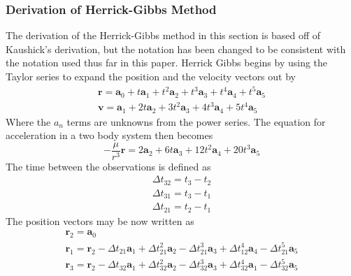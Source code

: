 \documentclass[12pt]{article}
\begin{document}
	\subsubsection{Derivation of Herrick-Gibbs Method}
	The derivation of the Herrick-Gibbs method in this section is based off of Kaushick's derivation\cite{Kaushick}, but the notation has been changed to be consistent with the notation used thus far in this paper. Herrick Gibbs begins by using the Taylor series to expand the position and the velocity vectors out by 
	\begin{equation}
	\begin{array} { l } { \mathbf { r } = \mathbf { a } _ { 0 } + t \mathbf { a } _ { 1 } + t ^ { 2 } \mathbf { a } _ { 2 } + t ^ { 3 } \mathbf { a } _ { 3 } + t ^ { 4 } \mathbf { a } _ { 4 } + t ^ { 5 } \mathbf { a } _ { 5 } } \\ { \mathbf { v } = \mathbf { a } _ { 1 } + 2 t \mathbf { a } _ { 2 } + 3 t ^ { 2 } \mathbf { a } _ { 3 } + 4 t ^ { 3 } \mathbf { a } _ { 4 } + 5 t ^ { 4 } \mathbf { a } _ { 5 } } \end{array}
	\end{equation}
	Where the $a_n$ terms are unknowns from the power series. The equation for acceleration in a two body system then becomes
	\begin{equation}
	- \frac { \mu } { r ^ { 3 } } \mathbf { r } = 2 \mathbf { a } _ { 2 } + 6 t \mathbf { a } _ { 3 } + 12 t ^ { 2 } \mathbf { a } _ { 4 } + 20 t ^ { 3 } \mathbf { a } _ { 5 }
	\end{equation}
	The time between the observations is defined as 
	\begin{equation}
	\begin{array} { l } { \Delta t _ { 32 } = t _ { 3 } - t _ { 2 } } \\ { \Delta t _ { 31 } = t _ { 3 } - t _ { 1 } } \\ { \Delta t _ { 21 } = t _ { 2 } - t _ { 1 } } \end{array}
	\end{equation}
	The position vectors may be now written as 
	\begin{equation}
	\begin{array} { l }
	{ \mathbf { r } _ { 2 } = \mathbf { a } _ { 0 } } \\ 
	 { \mathbf { r } _ { 1 } = \mathbf { r } _ { 2 } - \Delta t _ { 21 } \mathbf { a } _ { 1 } + \Delta t _ { 21 } ^ { 2 } \mathbf { a } _ { 2 } - \Delta t _ { 21 } ^ { 3 } \mathbf { a } _ { 3 } + \Delta t _ { 12 } ^ { 4 } \mathbf { a } _ { 4 } - \Delta t _ { 21 } ^ { 5 } \mathbf { a } _ { 5 } } \\ 
	
	{ \mathbf { r } _ { 3 } = \mathbf { r } _ { 2 } - \Delta t _ { 32 } \mathbf { a } _ { 1 } + \Delta t _ { 32 } ^ { 2 } \mathbf { a } _ { 2 } - \Delta t _ { 32 } ^ { 3 } \mathbf { a } _ { 3 } + \Delta t _ { 32 } ^ { 4 } \mathbf { a } _ { 1 } - \Delta t _ { 32 } ^ { 5 } \mathbf { a } _ { 5 } } \\ 	
	\end{array}
	\end{equation}
\end{document}
